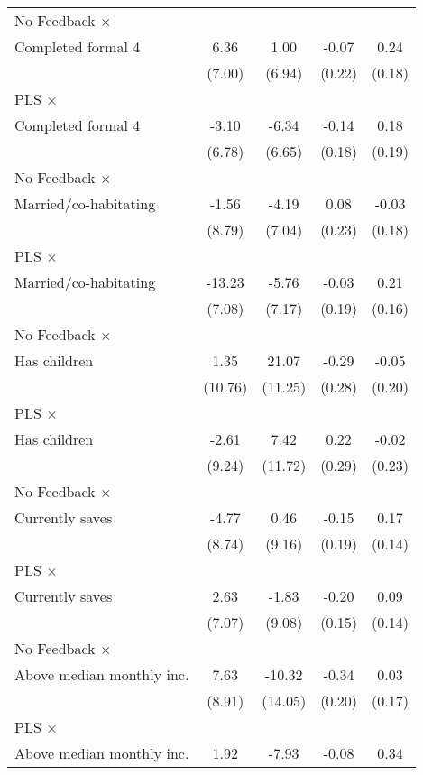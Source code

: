 \begin{table}[htbp]
\begin{tabular}{l*{4}{c}}
No Feedback $\times$ \\ Completed formal 4&     6.36&     1.00&    -0.07&     0.24\\
                &   (7.00)&   (6.94)&   (0.22)&   (0.18)\\
\addlinespace
PLS $\times$ \\ Completed formal 4&    -3.10&    -6.34&    -0.14&     0.18\\
                &   (6.78)&   (6.65)&   (0.18)&   (0.19)\\
\addlinespace
No Feedback $\times$ \\ Married/co-habitating&    -1.56&    -4.19&     0.08&    -0.03\\
                &   (8.79)&   (7.04)&   (0.23)&   (0.18)\\
\addlinespace
PLS $\times$ \\ Married/co-habitating&   -13.23&    -5.76&    -0.03&     0.21\\
                &   (7.08)&   (7.17)&   (0.19)&   (0.16)\\
\addlinespace
No Feedback $\times$ \\ Has children&     1.35&    21.07&    -0.29&    -0.05\\
                &  (10.76)&  (11.25)&   (0.28)&   (0.20)\\
\addlinespace
PLS $\times$ \\ Has children&    -2.61&     7.42&     0.22&    -0.02\\
                &   (9.24)&  (11.72)&   (0.29)&   (0.23)\\
\addlinespace
No Feedback $\times$ \\ Currently saves&    -4.77&     0.46&    -0.15&     0.17\\
                &   (8.74)&   (9.16)&   (0.19)&   (0.14)\\
\addlinespace
PLS $\times$ \\ Currently saves&     2.63&    -1.83&    -0.20&     0.09\\
                &   (7.07)&   (9.08)&   (0.15)&   (0.14)\\
\addlinespace
No Feedback $\times$ \\ Above median monthly inc.&     7.63&   -10.32&    -0.34&     0.03\\
                &   (8.91)&  (14.05)&   (0.20)&   (0.17)\\
\addlinespace
PLS $\times$ \\ Above median monthly inc.&     1.92&    -7.93&    -0.08&     0.34\\

\end{tabular}
\end{table}
